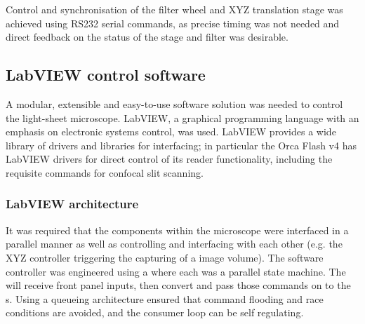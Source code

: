 Control and synchronisation of the filter wheel and XYZ translation stage was achieved using \gls{RS232} serial commands, as precise timing was not needed and direct feedback on the status of the stage and filter was desirable. %

%



\subsection{\gls{LabVIEW} control software}

A modular, extensible and easy-to-use software solution was needed to control the \gls{light-sheet} microscope.
\gls{LabVIEW}, a graphical programming language with an emphasis on electronic systems control, was used.
\gls{LabVIEW} provides a wide library of drivers and libraries for interfacing; in particular the Orca Flash v4 has \gls{LabVIEW} drivers for direct control of its reader functionality, including the requisite commands for confocal slit scanning.

\subsubsection{\gls{LabVIEW} architecture}


It was required that the components within the microscope were interfaced in a parallel manner as well as controlling and interfacing with each other (e.g. the XYZ controller triggering the capturing of a image volume).
The software controller was engineered using a  where each  was a parallel \gls{state machine}.
The  will receive front panel inputs, then convert and pass those commands on to the s.
Using a \gls{queueing architecture} ensured that command flooding and \gls{race conditions} are avoided, and the consumer loop can be self regulating.


